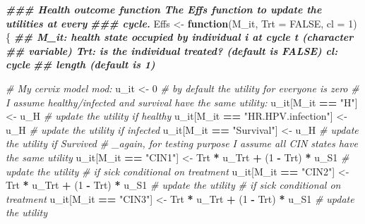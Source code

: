 \documentclass[
]{article}
\newenvironment{Shaded}{\begin{snugshade}}{\end{snugshade}}
\newcommand{\AttributeTok}[1]{\textcolor[rgb]{0.13,0.29,0.53}{#1}}
\newcommand{\CommentTok}[1]{\textcolor[rgb]{0.56,0.35,0.01}{\textit{#1}}}
\newcommand{\ConstantTok}[1]{\textcolor[rgb]{0.56,0.35,0.01}{#1}}
\newcommand{\ControlFlowTok}[1]{\textcolor[rgb]{0.13,0.29,0.53}{\textbf{#1}}}
\newcommand{\DecValTok}[1]{\textcolor[rgb]{0.00,0.00,0.81}{#1}}
\newcommand{\DocumentationTok}[1]{\textcolor[rgb]{0.56,0.35,0.01}{\textbf{\textit{#1}}}}
\newcommand{\NormalTok}[1]{#1}
\newcommand{\OtherTok}[1]{\textcolor[rgb]{0.56,0.35,0.01}{#1}}
\newcommand{\SpecialCharTok}[1]{\textcolor[rgb]{0.81,0.36,0.00}{\textbf{#1}}}
\newcommand{\StringTok}[1]{\textcolor[rgb]{0.31,0.60,0.02}{#1}}
\begin{document}
\begin{Shaded}
\begin{Highlighting}[]
\DocumentationTok{\#\#\# Health outcome function The Effs function to update the utilities at every}
\DocumentationTok{\#\#\# cycle.}
\NormalTok{Effs }\OtherTok{\textless{}{-}} \ControlFlowTok{function}\NormalTok{(M\_it, }\AttributeTok{Trt =} \ConstantTok{FALSE}\NormalTok{, }\AttributeTok{cl =} \DecValTok{1}\NormalTok{) \{}
    \DocumentationTok{\#\# M\_it: health state occupied by individual i at cycle t (character}
    \DocumentationTok{\#\# variable) Trt: is the individual treated? (default is FALSE) cl: cycle}
    \DocumentationTok{\#\# length (default is 1)}

    \CommentTok{\# My cervix model mod:}
\NormalTok{    u\_it }\OtherTok{\textless{}{-}} \DecValTok{0}  \CommentTok{\# by default the utility for everyone is zero}
    \CommentTok{\# I assume healthy/infected and survival have the same utility:}
\NormalTok{    u\_it[M\_it }\SpecialCharTok{==} \StringTok{"H"}\NormalTok{] }\OtherTok{\textless{}{-}}\NormalTok{ u\_H  }\CommentTok{\# update the utility if healthy}
\NormalTok{    u\_it[M\_it }\SpecialCharTok{==} \StringTok{"HR.HPV.infection"}\NormalTok{] }\OtherTok{\textless{}{-}}\NormalTok{ u\_H  }\CommentTok{\# update the utility if infected}
\NormalTok{    u\_it[M\_it }\SpecialCharTok{==} \StringTok{"Survival"}\NormalTok{] }\OtherTok{\textless{}{-}}\NormalTok{ u\_H  }\CommentTok{\# update the utility if Survived}
    \CommentTok{\# \_again, for testing purpose I assume all CIN states have the same utility}
\NormalTok{    u\_it[M\_it }\SpecialCharTok{==} \StringTok{"CIN1"}\NormalTok{] }\OtherTok{\textless{}{-}}\NormalTok{ Trt }\SpecialCharTok{*}\NormalTok{ u\_Trt }\SpecialCharTok{+}\NormalTok{ (}\DecValTok{1} \SpecialCharTok{{-}}\NormalTok{ Trt) }\SpecialCharTok{*}\NormalTok{ u\_S1  }\CommentTok{\# update the utility}
    \CommentTok{\# if sick conditional on treatment}
\NormalTok{    u\_it[M\_it }\SpecialCharTok{==} \StringTok{"CIN2"}\NormalTok{] }\OtherTok{\textless{}{-}}\NormalTok{ Trt }\SpecialCharTok{*}\NormalTok{ u\_Trt }\SpecialCharTok{+}\NormalTok{ (}\DecValTok{1} \SpecialCharTok{{-}}\NormalTok{ Trt) }\SpecialCharTok{*}\NormalTok{ u\_S1  }\CommentTok{\# update the utility }
    \CommentTok{\# if sick conditional on treatment}
\NormalTok{    u\_it[M\_it }\SpecialCharTok{==} \StringTok{"CIN3"}\NormalTok{] }\OtherTok{\textless{}{-}}\NormalTok{ Trt }\SpecialCharTok{*}\NormalTok{ u\_Trt }\SpecialCharTok{+}\NormalTok{ (}\DecValTok{1} \SpecialCharTok{{-}}\NormalTok{ Trt) }\SpecialCharTok{*}\NormalTok{ u\_S1  }\CommentTok{\# update the utility }

\end{Highlighting}
\end{Shaded}
\end{document}
